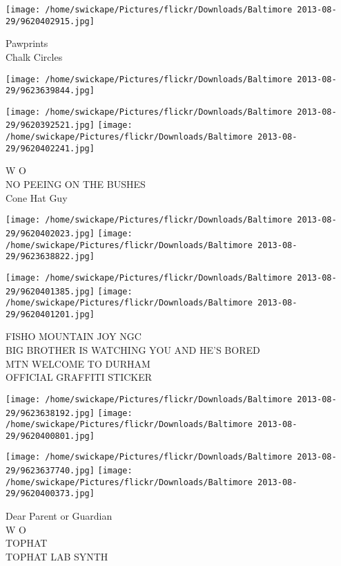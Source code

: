 \documentclass[10pt,letterpaper]{article}
\begin{document}
\vspace{0.25in}
\texttt{[image: /home/swickape/Pictures/flickr/Downloads/Baltimore 2013-08-29/9620402915.jpg]}

Pawprints\\
Chalk Circles\\
\pagebreak

\texttt{[image: /home/swickape/Pictures/flickr/Downloads/Baltimore 2013-08-29/9623639844.jpg]}

\vspace{0.25in}
\texttt{[image: /home/swickape/Pictures/flickr/Downloads/Baltimore 2013-08-29/9620392521.jpg]}
\texttt{[image: /home/swickape/Pictures/flickr/Downloads/Baltimore 2013-08-29/9620402241.jpg]}

W O\\
NO PEEING ON THE BUSHES\\
Cone Hat Guy\\
\pagebreak

\texttt{[image: /home/swickape/Pictures/flickr/Downloads/Baltimore 2013-08-29/9620402023.jpg]}
\texttt{[image: /home/swickape/Pictures/flickr/Downloads/Baltimore 2013-08-29/9623638822.jpg]}

\texttt{[image: /home/swickape/Pictures/flickr/Downloads/Baltimore 2013-08-29/9620401385.jpg]}
\texttt{[image: /home/swickape/Pictures/flickr/Downloads/Baltimore 2013-08-29/9620401201.jpg]}

FISHO MOUNTAIN JOY NGC\\
BIG BROTHER IS WATCHING YOU AND HE'S BORED\\
MTN WELCOME TO DURHAM\\
OFFICIAL GRAFFITI STICKER\\
\pagebreak

\texttt{[image: /home/swickape/Pictures/flickr/Downloads/Baltimore 2013-08-29/9623638192.jpg]}
\texttt{[image: /home/swickape/Pictures/flickr/Downloads/Baltimore 2013-08-29/9620400801.jpg]}

\texttt{[image: /home/swickape/Pictures/flickr/Downloads/Baltimore 2013-08-29/9623637740.jpg]}
\texttt{[image: /home/swickape/Pictures/flickr/Downloads/Baltimore 2013-08-29/9620400373.jpg]}

Dear Parent or Guardian\\
W O\\
TOPHAT\\
TOPHAT LAB SYNTH\\
\pagebreak
\end{document}
